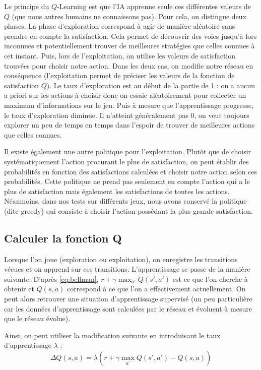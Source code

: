 Le principe du $Q$-Learning est que l'IA apprenne seule ces différentes valeurs de $Q$ (que nous autres humains ne connaissons pas). Pour cela, on distingue deux phases.
La phase d'exploration correspond à agir de manière aléatoire sans prendre en compte la satisfaction. Cela permet de découvrir des voies jusqu'à lors inconnues et 
potentiellement trouver de meilleures stratégies que celles connues à cet instant. Puis, lors de l'exploitation, on utilise les valeurs de satisfaction trouvées
pour choisir notre action. Dans les deux cas, on modifie notre réseau en conséquence (l'exploitation permet de préciser les valeurs de la fonction de satisfaction $Q$).
Le taux d'exploration est au début de la partie de 1 : on a aucun a priori sur les actions à choisir donc on essaie aléatoirement pour collecter un maximum d'informations
sur le jeu. Puis à mesure que l'apprentissage progresse, le taux d'exploration diminue. Il n'atteint généralement pas 0, on veut toujours explorer un peu de temps en temps
dans l'espoir de trouver de meilleures actions que celles connues. 

Il existe également une autre politique pour l'exploitation. Plutôt que de choisir systématiquement l'action procurant le plus de satisfaction, on peut
établir des probabilités en fonction des satisfactions calculées et choisir notre action selon ces probabilités. Cette politique ne prend pas seulement en compte
l'action qui a le plus de satisfaction mais également les satisfactions de toutes les actions. Néanmoins, dans nos tests sur différents jeux, nous avons conservé
la politique (dite greedy) qui consiste à choisir l'action possédant la plus grande satisfaction.

\subsection{Calculer la fonction Q}

Lorsque l'on joue (exploration ou exploitation), on enregistre les transitions vécues et on apprend sur ces transitions. L'apprentissage se passe de la manière
suivante. D'après \ref{eq:bellman}, $r + \gamma \max_{a'} Q\left(s',a'\right)$ est ce que l'on cherche à obtenir et $Q\left(s,a\right)$ correspond à ce que l'on
a effectivement actuellement. On peut alors retrouver une situation d'apprentissage supervisé (un peu particulière car les données d'apprentissage sont calculées par 
le réseau et évoluent à mesure que le réseau évolue).

Ainsi, on peut utiliser la modification suivante en introduisant le taux d'apprentissage $\lambda$ : 
\begin{equation}
 \Delta Q\left(s,a\right) = \lambda\left(r + \gamma \max_{a'} Q\left(s',a'\right) - Q\left(s,a\right)\right)
 \label{eq:modif-bellman}
\end{equation}

